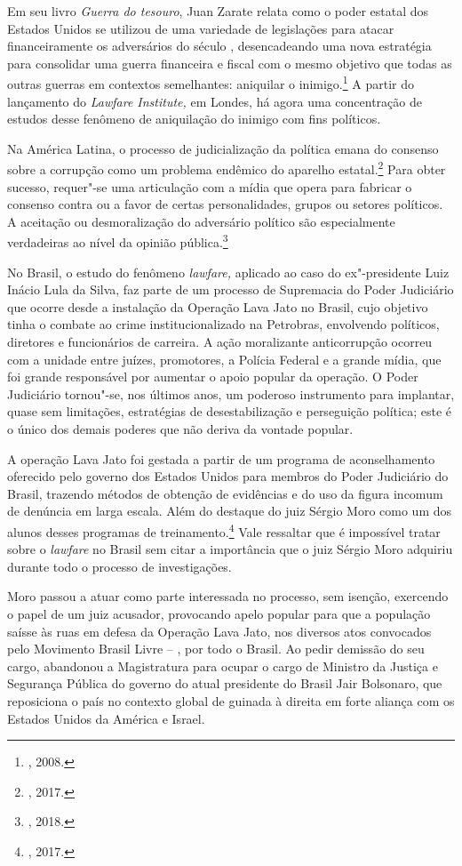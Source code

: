 Em seu livro \emph{Guerra do tesouro}, Juan Zarate relata como o poder estatal
dos Estados Unidos se utilizou de uma variedade de legislações para
atacar financeiramente os adversários do século , desencadeando uma
nova estratégia para consolidar uma guerra financeira e fiscal com o
mesmo objetivo que todas as outras guerras em contextos semelhantes:
aniquilar o inimigo.\footnote{, 2008.} A partir do lançamento do
\emph{Lawfare Institute,} em Londes, há agora uma concentração de
estudos desse fenômeno de aniquilação do inimigo com fins políticos.

Na América Latina, o processo de judicialização da política emana do
consenso sobre a corrupção como um problema endêmico do aparelho estatal.\footnote{, 2017.} Para obter sucesso, requer"-se uma articulação com a
mídia que opera para fabricar o consenso contra ou a favor de certas
personalidades, grupos ou setores políticos. A aceitação ou
desmoralização do adversário político são especialmente verdadeiras ao
nível da opinião pública.\footnote{, 2018.}

No Brasil, o estudo do fenômeno \emph{lawfare,} aplicado ao caso do
ex"-presidente Luiz Inácio Lula da Silva, faz parte de um processo de
Supremacia do Poder Judiciário que ocorre desde a instalação da Operação
Lava Jato no Brasil, cujo objetivo tinha o combate ao crime
institucionalizado na Petrobras, envolvendo políticos, diretores e
funcionários de carreira. A ação moralizante anticorrupção ocorreu com a
unidade entre juízes, promotores, a Polícia Federal e a grande mídia,
que foi grande responsável por aumentar o apoio popular da operação. O
Poder Judiciário tornou"-se, nos últimos anos, um poderoso instrumento
para implantar, quase sem limitações, estratégias de desestabilização e
perseguição política; este é o único dos demais poderes que não deriva
da vontade popular.

A operação Lava Jato foi gestada a partir de um programa de
aconselhamento oferecido pelo governo dos Estados Unidos para membros do
Poder Judiciário do Brasil, trazendo métodos de obtenção de evidências e
do uso da figura incomum de denúncia em larga escala. Além do destaque
do juiz Sérgio Moro como um dos alunos desses programas de treinamento.\footnote{, 2017.}
Vale ressaltar que é impossível tratar sobre o \emph{lawfare} no Brasil sem citar a importância que o juiz Sérgio Moro adquiriu durante todo o processo de investigações.

Moro passou a atuar como parte interessada no processo, sem isenção,
exercendo o papel de um juiz acusador, provocando apelo popular para que
a população saísse às ruas em defesa da Operação Lava Jato, nos diversos
atos convocados pelo Movimento Brasil Livre -- , por todo o Brasil.
Ao pedir demissão do seu cargo, abandonou a Magistratura para ocupar o
cargo de Ministro da Justiça e Segurança Pública do governo do atual
presidente do Brasil Jair Bolsonaro, que reposiciona o país no contexto
global de guinada à direita em forte aliança com os Estados Unidos da
América e Israel.

